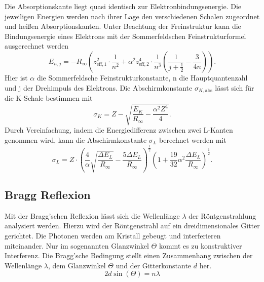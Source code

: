 Die Absorptionskante liegt quasi identisch zur Elektronbindungsenergie. Die jeweiligen Energien werden nach
ihrer Lage den verschiedenen Schalen zugeordnet und heißen Absorptionskanten.
Unter Beachtung der Freinstruktur kann die Bindungsenergie eines Elektrons mit der Sommerfeldschen Feinstrukturformel
ausgerechnet werden
\begin{equation*}\label{eq:Bindungsenergie_Sommerfeld}
    E_{n,j} = -R_\infty \left(z_{\text{eff},1}^2 \cdot \frac{1}{n^2} + α^2z_{\text{eff},2}^4 \cdot \frac{1}{n^3}\left(\frac{1}{j + \frac{1}{2}} - \frac{3}{4n}\right)\right).
\end{equation*}
Hier ist $α$ die Sommerfeldsche Feinstrukturkonstante, n die Hauptquantenzahl und j der Drehimpuls des Elektrons.
Die Abschirmkonstante $σ_{K,\text{abs}}$ lässt sich für die K-Schale bestimmen mit
\begin{equation*}\label{eq:Abschirmkonstante_K}
    σ_K = Z - \sqrt{\frac{E_K}{R_\infty} - \frac{α^2Z^4}{4}}.
\end{equation*}
Durch Vereinfachung, indem die Energiedifferenz zwischen zwei L-Kanten genommen wird, kann die Abschirmkonstante
$σ_L$ berechnet werden mit
\begin{equation*}\label{eq:Abschirmkonstante_L}
    σ_L = Z \cdot \left(\frac{4}{α}\sqrt{\frac{ΔE_L}{R_\infty}} - \frac{5ΔE_L}{R_{\infty}}\right)^{\frac{1}{2}}\left(1 + \frac{19}{32}α^2\frac{ΔE_L}{R_{\infty}}\right)^{\frac{1}{2}}.
\end{equation*}

\subsection{Bragg Reflexion}
\label{sec:Bragg_Reflexion}
Mit der Bragg'schen Reflexion lässt sich die Wellenlänge $λ$ der Röntgenstrahlung analysiert werden.
Hierzu wird der Röntgenstrahl auf ein dreidimensionales Gitter gerichtet. Die Photonen werden am Kristall 
gebeugt und interferieren miteinander. Nur im sogenannten Glanzwinkel $\Theta$ kommt es zu konstruktiver Interferenz.
Die Bragg'sche Bedingung stellt einen Zusammenhang zwischen der Wellenlänge $λ$, dem Glanzwinkel $\Theta$ und der Gitterkonstante $d$ her.
\begin{equation}\label{eq:Bragg_Bedingung}
    2 d \sin(\Theta) = n λ
\end{equation}



